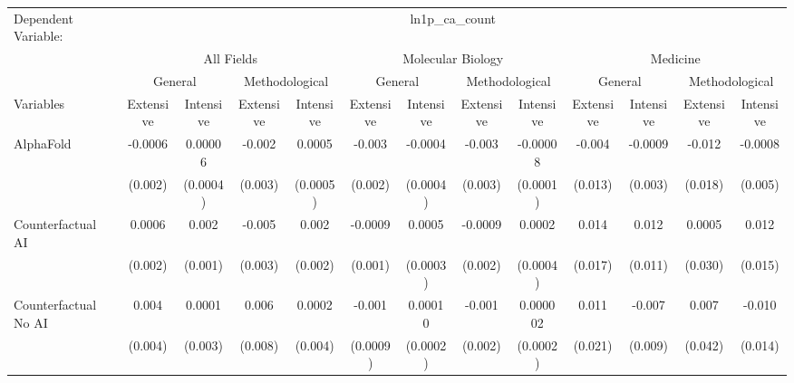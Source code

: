 \begingroup
\centering
\begin{tabular}{lcccccccccccc}
   \tabularnewline \midrule \midrule
   Dependent Variable: & \multicolumn{12}{c}{ln1p\_ca\_count}\\
 & \multicolumn{4}{c}{All Fields} & \multicolumn{4}{c}{Molecular Biology} & \multicolumn{4}{c}{Medicine} \\
\cmidrule(lr){2-5} \cmidrule(lr){6-9} \cmidrule(lr){10-13}
 & \multicolumn{2}{c}{General} & \multicolumn{2}{c}{Methodological} & \multicolumn{2}{c}{General} & \multicolumn{2}{c}{Methodological} & \multicolumn{2}{c}{General} & \multicolumn{2}{c}{Methodological} \\
\cmidrule(lr){2-3} \cmidrule(lr){4-5} \cmidrule(lr){6-7} \cmidrule(lr){8-9} \cmidrule(lr){10-11} \cmidrule(lr){12-13}
Variables & \multicolumn{1}{c}{Extensive} & \multicolumn{1}{c}{Intensive} & \multicolumn{1}{c}{Extensive} & \multicolumn{1}{c}{Intensive} & \multicolumn{1}{c}{Extensive} & \multicolumn{1}{c}{Intensive} & \multicolumn{1}{c}{Extensive} & \multicolumn{1}{c}{Intensive} & \multicolumn{1}{c}{Extensive} & \multicolumn{1}{c}{Intensive} & \multicolumn{1}{c}{Extensive} & \multicolumn{1}{c}{Intensive} \\
\cmidrule(lr){1-1}\cmidrule(lr){2-2} \cmidrule(lr){3-3} \cmidrule(lr){4-4} \cmidrule(lr){5-5} \cmidrule(lr){6-6} \cmidrule(lr){7-7} \cmidrule(lr){8-8} \cmidrule(lr){9-9} \cmidrule(lr){10-10} \cmidrule(lr){11-11} \cmidrule(lr){12-12} \cmidrule(lr){13-13}
   AlphaFold                                & -0.0006 & 0.00006  & -0.002  & 0.0005   & -0.003   & -0.0004  & -0.003  & -0.00008  & -0.004  & -0.0009 & -0.012  & -0.0008\\   
                                            & (0.002) & (0.0004) & (0.003) & (0.0005) & (0.002)  & (0.0004) & (0.003) & (0.0001)  & (0.013) & (0.003) & (0.018) & (0.005)\\   
   Counterfactual AI                        & 0.0006  & 0.002    & -0.005  & 0.002    & -0.0009  & 0.0005   & -0.0009 & 0.0002    & 0.014   & 0.012   & 0.0005  & 0.012\\   
                                            & (0.002) & (0.001)  & (0.003) & (0.002)  & (0.001)  & (0.0003) & (0.002) & (0.0004)  & (0.017) & (0.011) & (0.030) & (0.015)\\   
   Counterfactual No AI                     & 0.004   & 0.0001   & 0.006   & 0.0002   & -0.001   & 0.00010  & -0.001  & 0.000002  & 0.011   & -0.007  & 0.007   & -0.010\\   
                                            & (0.004) & (0.003)  & (0.008) & (0.004)  & (0.0009) & (0.0002) & (0.002) & (0.0002)  & (0.021) & (0.009) & (0.042) & (0.014)\\   

\end{tabular}
